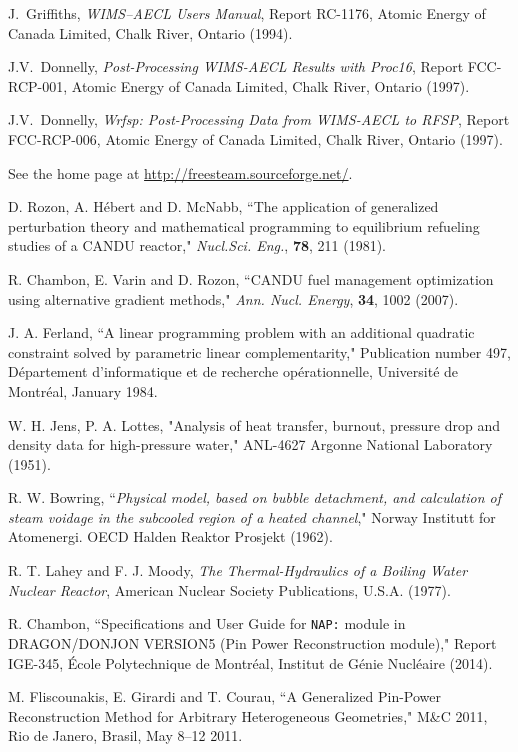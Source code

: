 \begin{thebibliography}{99}
J.~Griffiths,  
\textsl{WIMS--AECL Users Manual},
Report RC-1176, Atomic Energy of Canada Limited, Chalk River, Ontario (1994).

J.V.~Donnelly,  
\textsl{Post-Processing WIMS-AECL Results with Proc16},
Report FCC-RCP-001, Atomic Energy of Canada Limited, Chalk River, Ontario (1997).

J.V.~Donnelly,  
\textsl{Wrfsp: Post-Processing Data from WIMS-AECL to RFSP},
Report FCC-RCP-006, Atomic Energy of Canada Limited, Chalk River, Ontario (1997).

See the home page at \url{http://freesteam.sourceforge.net/}.

D. Rozon, A. H\'ebert and D. McNabb, ``The application of generalized perturbation theory and mathematical programming
to equilibrium refueling studies of a CANDU reactor," {\sl Nucl.Sci. Eng.}, {\bf 78}, 211 (1981).

R. Chambon, E. Varin and D. Rozon, ``CANDU fuel management optimization using alternative gradient
methods," {\sl Ann. Nucl. Energy}, {\bf 34}, 1002 (2007).

J. A. Ferland, ``A linear programming problem with an additional
quadratic constraint solved by parametric linear complementarity,"
Publication number 497, D\'epartement d'informatique et de recherche
op\'erationnelle, Universit\'e de Montr\'eal, January 1984.

W. H. Jens, P. A. Lottes, "Analysis of heat transfer, burnout, pressure drop and density data for high-pressure water," ANL-4627
Argonne National Laboratory (1951).

R. W. Bowring, ``\textsl{Physical model, based on bubble detachment, and calculation of steam voidage in the subcooled region of a heated channel},"
Norway Institutt for Atomenergi. OECD Halden Reaktor Prosjekt (1962).

R. T. Lahey and F. J. Moody, {\sl The Thermal-Hydraulics of a Boiling Water Nuclear Reactor},
American Nuclear Society Publications, U.S.A. (1977).

R. Chambon, ``Specifications and User Guide for {\tt NAP:} module in DRAGON/DONJON VERSION5
(Pin Power Reconstruction module)," Report IGE-345,
\'Ecole Polytechnique de Montr\'eal,
 Institut de G\'enie Nucl\'eaire (2014).

M. Fliscounakis, E. Girardi and T. Courau, ``A Generalized Pin-Power Reconstruction Method for
Arbitrary Heterogeneous Geometries," M\&C 2011, Rio de Janero, Brasil, May 8--12 2011.


\end{thebibliography}
